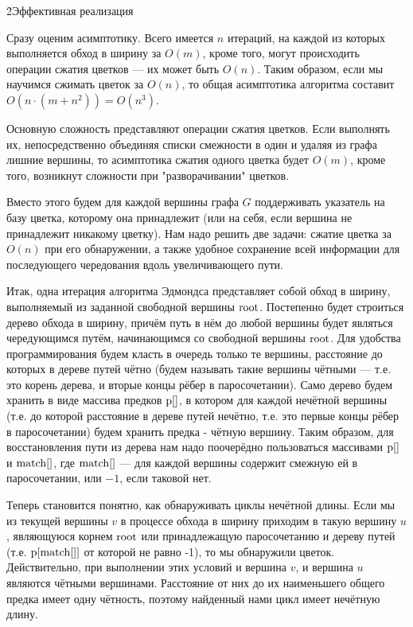 \h2{Эффективная реализация}

Сразу оценим асимптотику. Всего имеется $n$ итераций, на каждой из которых выполняется обход в ширину за $O(m)$, кроме того, могут происходить операции сжатия цветков --- их может быть $O(n)$. Таким образом, если мы научимся сжимать цветок за $O(n)$, то общая асимптотика алгоритма составит $O(n \cdot (m + n^2)) = O(n^3)$.

Основную сложность представляют операции сжатия цветков. Если выполнять их, непосредственно объединяя списки смежности в один и удаляя из графа лишние вершины, то асимптотика сжатия одного цветка будет $O(m)$, кроме того, возникнут сложности при "разворачивании" цветков.

Вместо этого будем для каждой вершины графа $G$ поддерживать указатель на базу цветка, которому она принадлежит (или на себя, если вершина не принадлежит никакому цветку). Нам надо решить две задачи: сжатие цветка за $O(n)$ при его обнаружении, а также удобное сохранение всей информации для последующего чередования вдоль увеличивающего пути.

Итак, одна итерация алгоритма Эдмондса представляет собой обход в ширину, выполняемый из заданной свободной вершины $\rm root$. Постепенно будет строиться дерево обхода в ширину, причём путь в нём до любой вершины будет являться чередующимся путём, начинающимся со свободной вершины $\rm root$. Для удобства программирования будем класть в очередь только те вершины, расстояние до которых в дереве путей чётно (будем называть такие вершины чётными --- т.е. это корень дерева, и вторые концы рёбер в паросочетании). Само дерево будем хранить в виде массива предков $\rm p[]$, в котором для каждой нечётной вершины (т.е. до которой расстояние в дереве путей нечётно, т.е. это первые концы рёбер в паросочетании) будем хранить предка - чётную вершину. Таким образом, для восстановления пути из дерева нам надо поочерёдно пользоваться массивами $\rm p[]$ и $\rm match[]$, где $\rm match[]$ --- для каждой вершины содержит смежную ей в паросочетании, или $-1$, если таковой нет.

Теперь становится понятно, как обнаруживать циклы нечётной длины. Если мы из текущей вершины $v$ в процессе обхода в ширину приходим в такую вершину $u$, являющуюся корнем $\rm root$ или принадлежащую паросочетанию и дереву путей (т.е. $\rm p[match[]]$ от которой не равно -1), то мы обнаружили цветок. Действительно, при выполнении этих условий и вершина $v$, и вершина $u$ являются чётными вершинами. Расстояние от них до их наименьшего общего предка имеет одну чётность, поэтому найденный нами цикл имеет нечётную длину.

